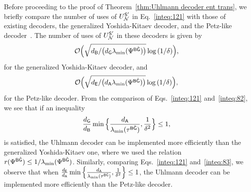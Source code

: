 Before proceeding to the proof of Theorem~\ref{thm:Uhlmann decoder ent trans}, we briefly compare the number of uses of $U_{\mathcal{N}}^{{\mathsf{S}}'}$ in Eq.~\eqref{inteq:121} with those of existing decoders, the generalized Yoshida-Kitaev decoder, and the Petz-like decoder~\cite{utsumi2024explicitdecoderQSVTt}.
The number of uses of $U_{\mathcal{N}}^{{\mathsf{S}}'}$ in these decoders is given by
\begin{align}
\label{inteq:82}
    {\mathcal{O}}\Big(\sqrt{d_{\mathsf{B}}/\big(d_{\mathsf{G}}\lambda_{\rm min}(\Psi^{{\mathsf{B}}\hat{{\mathsf{G}}}})\big)}\log{(1/\delta)}\Big),
\end{align}
for the generalized Yoshida-Kitaev decoder, and
\begin{align}
\label{inteq:83}
    {\mathcal{O}}\Big(\sqrt{d_{\mathsf{E}}/\big(d_{\mathsf{A}}\lambda_{\rm min}(\Psi^{{\mathsf{B}}\hat{{\mathsf{G}}}})\big)} \log{(1/\delta)}\Big),
\end{align}
for the Petz-like decoder.
From the comparison of Eqs.~\eqref{inteq:121} and~\eqref{inteq:82}, we see that if an inequality 
\begin{align}
    \frac{d_{\mathsf{G}}}{d_{\mathsf{B}}}\min\Big\{\frac{d_{\mathsf{A}}}{\lambda_{\rm min}(\tau^{{\mathsf{B}}\hat{{\mathsf{G}}}})}, \frac{1}{\delta^2}\Big\} \leq 1,
\end{align}
is satisfied, the Uhlmann decoder can be implemented more efficiently than the generalized Yoshida-Kitaev one, where we used the relation $r(\Psi^{{\mathsf{B}}\hat{{\mathsf{G}}}}) \leq 1/\lambda_{\rm min}(\Psi^{{\mathsf{B}}\hat{{\mathsf{G}}}})$.
Similarly, comparing Eqs.~\eqref{inteq:121} and~\eqref{inteq:83}, we observe that when $\frac{d_{\mathsf{E}}}{d_{\mathsf{A}}}\min\Big\{\frac{d_{\mathsf{A}}}{\lambda_{\rm min}(\tau^{{\mathsf{B}}\hat{{\mathsf{G}}}})}, \frac{1}{\delta^2}\Big\} \leq 1$, the Uhlmann decoder can be implemented more efficiently than the Petz-like decoder.










